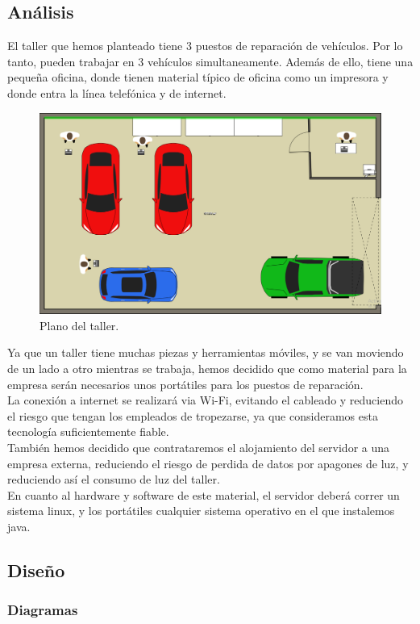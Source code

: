\documentclass{article}
\begin{document}
\subsection{Análisis}
El taller que hemos planteado tiene 3 puestos de reparación de vehículos. Por lo tanto, pueden trabajar en 3 vehículos simultaneamente.
Además de ello, tiene una pequeña oficina, donde tienen material típico de oficina como un impresora y donde entra la línea telefónica y de internet.
\begin{figure}[H]
  \centering
  \includegraphics[width=1.0\textwidth]{misc/planoTaller.PNG}
  \caption{Plano del taller.}
\end{figure}
Ya que un taller tiene muchas piezas y herramientas móviles, y se van moviendo de un lado a otro mientras se trabaja, 
hemos decidido que como material para la empresa serán necesarios unos portátiles para los puestos de reparación.\\
La conexión a internet se realizará via Wi-Fi, evitando el cableado y reduciendo el riesgo que tengan los empleados de 
tropezarse, ya que consideramos esta tecnología suficientemente fiable.\\ 
También hemos decidido que contrataremos el alojamiento del servidor a una empresa externa, reduciendo el riesgo de perdida de datos por apagones de 
luz, y reduciendo así el consumo de luz del taller. \\ En cuanto al hardware y software de este material, el servidor deberá correr un sistema linux, 
y los portátiles cualquier sistema operativo en el que instalemos java.
\subsection{Diseño} 
\subsubsection{Diagramas}
\end{document}
